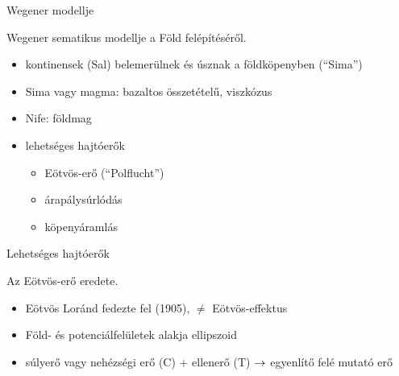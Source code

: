 \documentclass{beamer}
\begin{document}
\begin{frame}{Wegener modellje}
    \begin{minipage}[c]{0.55\textwidth}
        \centering
        
        Wegener sematikus modellje a Föld felépítéséről.
    \end{minipage}
    \hspace{10pt}
    \begin{minipage}[c]{0.4\textwidth}
        \begin{itemize}
            \item kontinensek (Sal) belemerülnek és úsznak a földköpenyben (``Sima'')
            \item Sima vagy magma: bazaltos összetételű, viszkózus
            \item Nife: földmag
            \item lehetséges hajtóerők
            \begin{itemize}
                \item Eötvös-erő (``Polflucht'')
                \item árapálysúrlódás
                \item köpenyáramlás
            \end{itemize}
        \end{itemize}
    \end{minipage}
\end{frame}


\begin{frame}{Lehetséges hajtóerők}
    \begin{minipage}[c]{0.5\textwidth}
        \centering
        
        Az Eötvös-erő eredete.
    \end{minipage}
    \hspace{10pt}
    \begin{minipage}[c]{0.4\textwidth}
        \begin{itemize}
            \item Eötvös Loránd fedezte fel (1905), $\ne$ Eötvös-effektus
            \item Föld- és potenciálfelületek alakja ellipszoid
            \item súlyerő vagy nehézségi erő (C) + ellenerő (T) $\rightarrow$ egyenlítő felé mutató erő
        \end{itemize}
    \end{minipage}
\end{frame}
\end{document}
